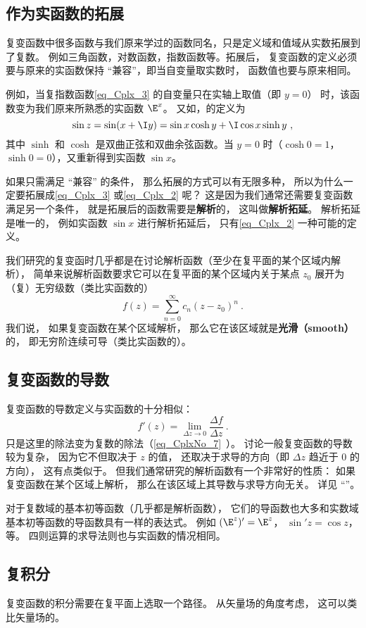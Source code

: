 \subsection{作为实函数的拓展}
复变函数中很多函数与我们原来学过的函数同名，只是定义域和值域从实数拓展到了复数。 例如三角函数，对数函数，指数函数等。拓展后， 复变函数的定义必须要与原来的实函数保持 “兼容”，即当自变量取实数时， 函数值也要与原来相同。

例如，当复指数函数\autoref{eq_Cplx_3} 的自变量只在实轴上取值（即 $y = 0$） 时，该函数变为我们原来所熟悉的实函数 $\E^x$。  又如，的定义为
\begin{equation}\label{eq_Cplx_2}
\sin z = \sin(x + \I y) = \sin x\cosh y + \I\cos x\sinh y~,
\end{equation}
其中 $\sinh $ 和 $\cosh $ 是双曲正弦和双曲余弦函数。当 $y = 0$ 时（$\cosh 0 = 1$， $\sinh 0 = 0$），又重新得到实函数 $\sin x$。

如果只需满足 “兼容” 的条件， 那么拓展的方式可以有无限多种， 所以为什么一定要拓展成\autoref{eq_Cplx_3} 或\autoref{eq_Cplx_2} 呢？ 这是因为我们通常还需要复变函数满足另一个条件， 就是拓展后的函数需要是\textbf{解析}的， 这叫做\textbf{解析拓延}。 %
解析拓延是唯一的， 例如实函数 $\sin x$ 进行解析拓延后， 只有\autoref{eq_Cplx_2} 一种可能的定义。

我们研究的复变函时几乎都是在讨论解析函数（至少在复平面的某个区域内解析）， 简单来说解析函数要求它可以在复平面的某个区域内关于某点 $z_0$ 展开为（复）无穷级数（类比实函数的）
\begin{equation}
f(z) = \sum_{n=0}^\infty c_n (z - z_0)^n~.
\end{equation}
我们说， 如果复变函数在某个区域解析， 那么它在该区域就是\textbf{光滑（smooth）}的， 即无穷阶连续可导（类比实函数的）。

\subsection{复变函数的导数}
复变函数的导数定义与实函数的十分相似：
\begin{equation}
f'(z) = \lim_{\Delta z \to 0} \frac{\Delta f}{\Delta z}~.
\end{equation}
只是这里的除法变为复数的除法（\autoref{eq_CplxNo_7}~）。 讨论一般复变函数的导数较为复杂， 因为它不但取决于 $z$ 的值， 还取决于求导的方向（即 $\Delta z$ 趋近于 $0$ 的方向）， 这有点类似于。 但我们通常研究的解析函数有一个非常好的性质： 如果复变函数在某个区域上解析， 那么在该区域上其导数与求导方向无关。 详见 “”。

对于复数域的基本初等函数（几乎都是解析函数）， 它们的导函数也大多和实数域基本初等函数的导函数具有一样的表达式。 例如 $(\E^z)' = \E^z$， $\sin' z = \cos z$， 等。 四则运算的求导法则也与实函数的情况相同。

\subsection{复积分}
复变函数的积分需要在复平面上选取一个路径。 从矢量场的角度考虑， 这可以类比矢量场的。
